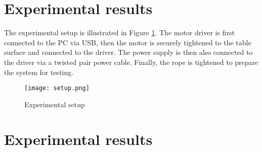 \section{Experimental results}
The experimental setup is illustrated in Figure \ref{fig:setup}. The motor driver 
is first connected to the PC via USB, then the motor is securely tightened to the 
table surface and connected to the driver. The power supply is then also connected 
to the driver via a twisted pair power cable. Finally, the rope is tightened to 
prepare the system for testing.  

\begin{figure}[htbp]
  \centering
  \texttt{[image: setup.png]}
  \caption{Experimental setup}
  \label{fig:setup}
\end{figure}
\FloatBarrier

\section{Experimental results}
